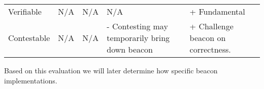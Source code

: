 \begin{table}[]
\begin{tabular}{@{}lllll@{}}
    Verifiable             & N/A                                                                       & N/A                                    & N/A                                                    & + Fundamental                                                    \\
    Contestable            & N/A                                                                       & N/A                                    & - Contesting may temporarily bring down beacon         & + Challenge beacon on correctness.                               \\ \bottomrule
    \end{tabular}
    \end{table}

    Based on this evaluation we will later determine how specific beacon implementations. 